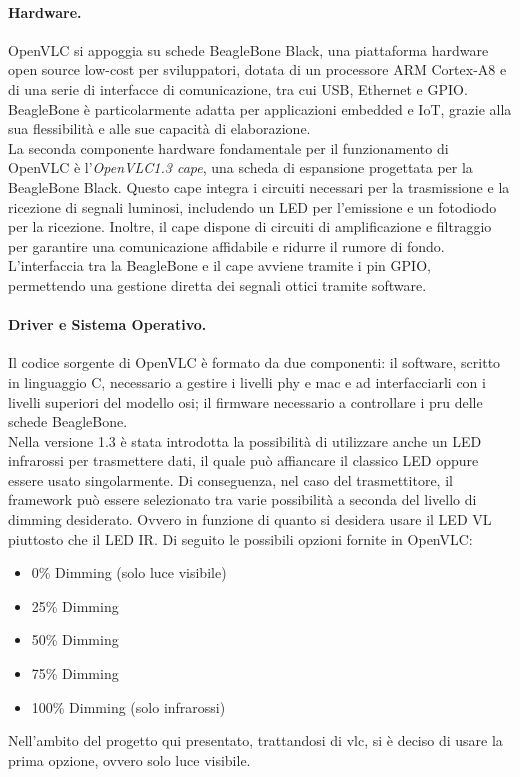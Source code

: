 \paragraph{Hardware.}
OpenVLC si appoggia su schede BeagleBone Black, una piattaforma hardware open source low-cost per sviluppatori, dotata di un processore ARM Cortex-A8 e di una serie di interfacce di comunicazione, tra cui USB, Ethernet e GPIO. BeagleBone è particolarmente adatta per applicazioni embedded e IoT, grazie alla sua flessibilità e alle sue capacità di elaborazione.\\
La seconda componente hardware fondamentale per il funzionamento di OpenVLC è l'\textit{OpenVLC1.3 cape}, una scheda di espansione progettata per la BeagleBone Black. Questo cape integra i circuiti necessari per la trasmissione e la ricezione di segnali luminosi, includendo un LED per l'emissione e un fotodiodo per la ricezione. Inoltre, il cape dispone di circuiti di amplificazione e filtraggio per garantire una comunicazione affidabile e ridurre il rumore di fondo. L'interfaccia tra la BeagleBone e il cape avviene tramite i pin GPIO, permettendo una gestione diretta dei segnali ottici tramite software.

\paragraph{Driver e Sistema Operativo.}
Il codice sorgente di OpenVLC è formato da due componenti: il software, scritto in linguaggio C, necessario a gestire i livelli \gls{phy} e \gls{mac} e ad interfacciarli con i livelli superiori del modello \gls{osi}; il firmware necessario a controllare i \gls{pru} delle schede BeagleBone.\\
Nella versione 1.3 è stata introdotta la possibilità di utilizzare anche un LED infrarossi per trasmettere dati, il quale può affiancare il classico LED oppure essere usato singolarmente.
Di conseguenza, nel caso del trasmettitore, il framework può essere selezionato tra varie possibilità a seconda del livello di dimming desiderato. Ovvero in funzione di quanto si desidera usare il LED VL piuttosto che il LED IR.
Di seguito le possibili opzioni fornite in OpenVLC:
\begin{itemize}
    \item 0\% Dimming (solo luce visibile)
    \item 25\% Dimming
    \item 50\% Dimming
    \item 75\% Dimming
    \item 100\% Dimming (solo infrarossi)
\end{itemize}
Nell'ambito del progetto qui presentato, trattandosi di \gls{vlc}, si è deciso di usare la prima opzione, ovvero solo luce visibile.

